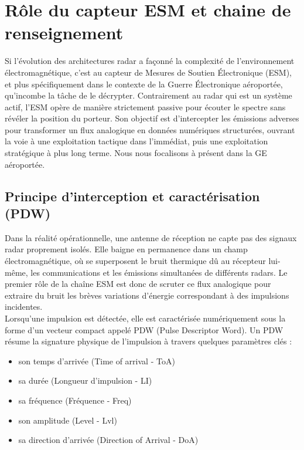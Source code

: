 \section{Rôle du capteur ESM et chaine de renseignement}
Si l'évolution des architectures radar a façonné la complexité de l'environnement électromagnétique, c'est au capteur de Mesures de Soutien Électronique (ESM), et plus spécifiquement dans le contexte de la Guerre Électronique aéroportée, qu'incombe la tâche de le décrypter. Contrairement au radar qui est un système actif, l'ESM opère de manière strictement passive pour écouter le spectre sans révéler la position du porteur. Son objectif est d'intercepter les émissions adverses pour transformer un flux analogique en données numériques structurées, ouvrant la voie à une exploitation tactique dans l'immédiat, puis une exploitation stratégique à plus long terme. Nous nous focalisons à présent dans la GE aéroportée.

\subsection{Principe d'interception et caractérisation (PDW)}
\label{seq:descPDW}
Dans la réalité opérationnelle, une antenne de réception ne capte pas des signaux radar proprement isolés. Elle baigne en permanence dans un champ électromagnétique, où se superposent le bruit thermique dû au récepteur lui-même, les communications et les émissions simultanées de différents radars. Le premier rôle de la chaîne ESM est donc de scruter ce flux analogique pour extraire du bruit les brèves variations d'énergie correspondant à des impulsions incidentes.\\

Lorsqu'une impulsion est détectée, elle est caractérisée numériquement sous la forme d'un vecteur compact appelé PDW (Pulse Descriptor Word). Un PDW résume la signature physique de l'impulsion à travers quelques paramètres clés :
\begin{itemize}
\item son temps d'arrivée (Time of arrival - ToA)
\item sa durée (Longueur d'impulsion - LI)
\item sa fréquence (Fréquence - Freq)
\item son amplitude (Level - Lvl)
\item sa direction d'arrivée (Direction of Arrival - DoA)\\
\end{itemize} 

